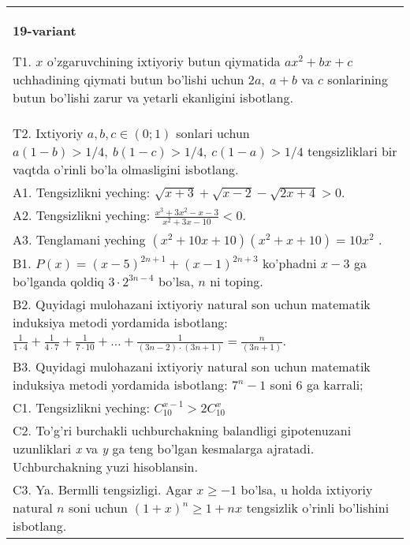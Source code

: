 \documentclass{article}
\begin{document}
\begin{tabular}{m{17cm}}
\textbf{19-variant}
\newline

T1. \(x\) o'zgaruvchining ixtiyoriy butun qiymatida \(ax^{2} + bx + c\) uchhadining qiymati butun bo'lishi uchun \(2a,\ a + b\) va \(c\) sonlarining butun bo'lishi zarur va yetarli ekanligini isbotlang. \\
T2. Ixtiyoriy \(a,b,c \in (0;1)\) sonlari uchun \(a(1 - b) > 1/4,\ b(1 - c) > 1/4,\ c(1 - a) > 1/4\) tengsizliklari bir vaqtda o'rinli bo'la olmasligini isbotlang. \\
A1. Tengsizlikni yeching: \(\sqrt{x + 3} + \sqrt{x - 2} - \sqrt{2x + 4} > 0\). \\
A2. Tengsizlikni yeching: \(\frac{x^{3} + 3x^{2} - x - 3}{x^{2} + 3x - 10} < 0\). \\
A3. Tenglamani yeching \(\left( x^{2} + 10x + 10 \right)\left( x^{2} + x + 10 \right) = 10x^{2}\) . \\
B1. \(P(x) = (x - 5)^{2n + 1} + (x - 1)^{2n + 3}\) ko'phadni \(x - 3\) ga bo'lganda qoldiq \(3 \cdot 2^{3n - 4}\) bo'lsa, \(n\) ni toping. \\
B2. Quyidagi mulohazani ixtiyoriy natural son uchun matematik induksiya metodi yordamida isbotlang: \(\frac{1}{1 \cdot 4} + \frac{1}{4 \cdot 7} + \frac{1}{7 \cdot 10} + \ldots + \frac{1}{(3n - 2) \cdot (3n + 1)} = \frac{n}{(3n + 1)}\). \\
B3. Quyidagi mulohazani ixtiyoriy natural son uchun matematik induksiya metodi yordamida isbotlang: \(7^{n} - 1\) soni 6 ga karrali; \\
C1. Tengsizlikni yeching: \(C_{10}^{x - 1} > 2C_{10}^{x}\) \\
C2. To'g'ri burchakli uchburchakning balandligi gipotenuzani uzunliklari \emph{x} va \emph{y} ga teng bo'lgan kesmalarga ajratadi. Uchburchakning yuzi hisoblansin. \\
C3. Ya. Bermlli tengsizligi. Agar \(x \geq - 1\) bo'lsa, u holda ixtiyoriy natural \(n\) soni uchun \((1 + x)^{n} \geq 1 + nx\) tengsizlik o'rinli bo'lishini isbotlang. \\

\end{tabular}
\vspace{1cm}
\end{document}
